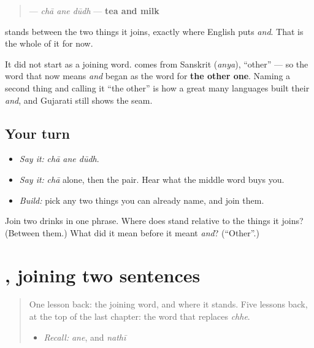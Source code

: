\begin{cousinweb}
\begin{quote}
\textbf{  } — \emph{chā ane dūdh} — \textbf{tea and milk}
\end{quote}

\textbf{} stands between the two things it joins, exactly where English puts \emph{and}. That is the whole of it for now.

It did not start as a joining word. \textbf{} comes from Sanskrit \textbf{} (\emph{anya}), \textquotedblleft{}other\textquotedblright{} — so the word that now means \emph{and} began as the word for \textbf{the other one}. Naming a second thing and calling it \textquotedblleft{}the other\textquotedblright{} is how a great many languages built their \emph{and}, and Gujarati still shows the seam.
\end{cousinweb}

\subsection*{Your turn}
\begin{itemize}
\raggedright
  \item \emph{Say it:} \emph{chā ane dūdh}.
  \item \emph{Say it:} \emph{chā} alone, then the pair. Hear what the middle word buys you.
  \item \emph{Build:} pick any two things you can already name, and join them.
\end{itemize}

\begin{tcolorbox}[breakable,colback=teal!4,colframe=teal!35!black,title={Before you move on}]
Join two drinks in one phrase. Where does \textbf{} stand relative to the things it joins? (Between them.) What did it mean before it meant \emph{and}? (\textquotedblleft{}Other\textquotedblright{}.)
\end{tcolorbox}
\section[\texorpdfstring{\gu{અને} (\gu{બે} \gu{વાક્ય}) (ane (be vākya))}{અને (બે વાક્ય) (ane (be vākya))}]{, joining two sentences}

\label{lesson:GU-C32-ane-clauses}



\begin{quote}
One lesson back: the joining word, and where it stands. Five lessons back, at the top of the last chapter: the word that replaces \emph{chhe}.

\begin{itemize}
\raggedright
  \item \emph{Recall:} \emph{ane}, and \emph{nathī}
\end{itemize}
\end{quote}

